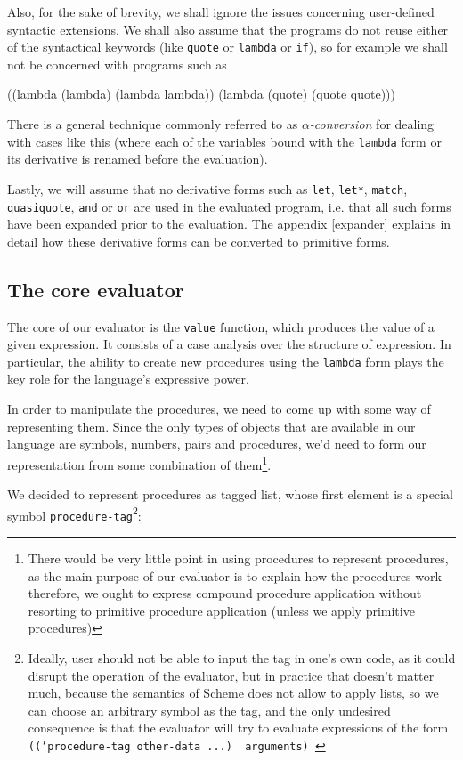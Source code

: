 Also, for the sake of brevity, we shall ignore the issues
concerning user-defined syntactic extensions. We shall also
assume that the programs do not reuse either of the syntactical
keywords (like \texttt{quote} or \texttt{lambda} or \texttt{if}),
so for example we shall not be concerned with programs such as
\begin{Snippet}
  ((lambda (lambda)
      (lambda lambda))
   (lambda (quote)
      (quote quote)))
\end{Snippet}

There is a general technique commonly referred to as
\textit{$\alpha$-conversion}\cite{SussmanSteele1976} for dealing with
cases like this (where each of the variables bound with the
\texttt{lambda} form or its derivative is renamed before the evaluation).

Lastly, we will assume that no derivative forms such as \texttt{let},
\texttt{let*}, \texttt{match}, \texttt{quasiquote}, \texttt{and}
or \texttt{or} are used in the evaluated program, i.e. that all such
forms have been expanded prior to the evaluation. The appendix \ref{expander}
explains in detail how these derivative forms can be converted
to primitive forms.


\subsection{The core evaluator}

The core of our evaluator is the \texttt{value} function, which
produces the value of a given expression. It consists of a case
analysis over the structure of expression. In particular,
the ability to create new procedures using the \texttt{lambda}
form plays the key role for the language's expressive power.

In order to manipulate the procedures, we need to come
up with some way of representing them. Since the only
types of objects that are available in our language are
symbols, numbers, pairs and procedures, we'd need
to form our representation from some combination
of them\footnote{There would be very little point in using procedures
to represent procedures, as the main purpose of our
evaluator is to explain how the procedures work -- therefore,
we ought to express compound procedure application without
resorting to primitive procedure application (unless we apply
primitive procedures)}.

We decided to represent procedures as tagged list, whose first
element is a special symbol \texttt{procedure-tag}\footnote{
Ideally, user should not be able to input the tag in one's own code,
as it could disrupt the operation of the evaluator, but
in practice that doesn't matter much, because the semantics of
Scheme does not allow to apply lists, so we can choose an
arbitrary symbol as the tag, and the only undesired consequence
is that the evaluator will try to evaluate expressions of the form
\texttt{(('procedure-tag other-data ...)\,\,arguments)
}}:

